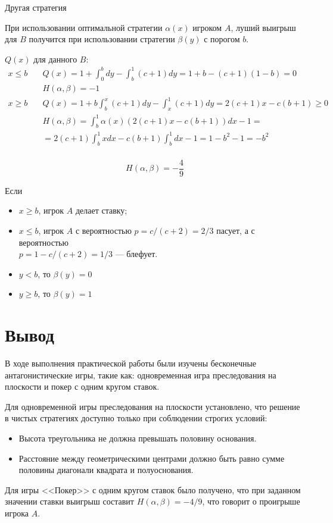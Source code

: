 \documentclass[12pt,a4paper]{article}
\begin{document}
\pagebreak
Другая стратегия

При использовании оптимальной стратегии $\alpha(x)$ игроком $A$, луший выигрыш
для $B$ получится при использовании стратегии $\beta(y)$ с порогом $b$.

$Q(x)$ для данного $B$:
\[
  \begin{aligned}
    x \leq b \quad & Q(x) = 1 + \int_{0}^{b}dy-\int_{b}^{1}(c+1)dy = 1+b-(c+1)(1-b)=0 \\
    & H(\alpha,\beta)=-1 \\
    x \ge  b \quad & Q(x) = 1 + b \int_{b}^{x}(c+1)dy - \int_{x}^{1}(c+1)dy=2(c+1)x-c(b+1) \ge 0 \\
    & H(\alpha,\beta)=\int_b^1\alpha(x)(2(c+1)x-c(b+1))dx - 1 = \\
    & =2(c+1)\int_b^1xdx-c(b+1)\int_b^1dx-1 = 1 - b^2 -1 = -b^2\\
  \end{aligned}
\]

\[
  H(\alpha,\beta) = -\frac{4}{9}
\]

Если

\begin{itemize}
  \item[] $x \geq b$, игрок $A$ делает ставку;
  \item[] $x \le  b$, игрок $A$ с вероятностью ${p=c/(c+2)=2/3}$ пасует,
  а с вероятностью \\${p=1 - c/(c+2)=1/3}$ --- блефует.
  \item[] $y <   b$, то $\beta(y) = 0$
  \item[] $y \ge b$, то $\beta(y) = 1$
\end{itemize}

\pagebreak

\section{Вывод}
В ходе выполнения практической работы были изучены бесконечные
антагонистические игры, такие как: одновременная игра преследования на
плоскости и покер с одним кругом ставок.

Для одновременной игры преследования на плоскости установлено, что решение
в чистых стратегиях доступно только при соблюдении строгих условий:
\begin{itemize}
  \item Высота треугольника не должна превышать половину основания.
  \item Расстояние между геометрическими центрами должно быть равно сумме
  половины диагонали квадрата и полуоснования.
\end{itemize}

Для игры <<Покер>> с одним кругом ставок было получено, что при
заданном значении ставки выигрыш составит $H(\alpha, \beta) = -4/9$,
что говорит о проигрыше игрока $A$.
\end{document}
